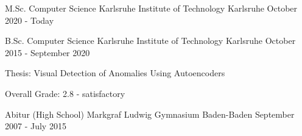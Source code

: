 


\begin{cventries}


\cventry
{M.Sc. Computer Science} %
{Karlsruhe Institute of Technology} %
{Karlsruhe} %
{October 2020 - Today} %
{ %
\begin{cvitems}
\end{cvitems}
}

\cventry
{B.Sc. Computer Science} %
{Karlsruhe Institute of Technology} %
{Karlsruhe} %
{October 2015 - September 2020} %
{ %
\begin{cvitems}
    \item{Thesis: Visual Detection of Anomalies Using Autoencoders}
    \item{Overall Grade: 2.8 - satisfactory}
\end{cvitems}
}

\cventry
{Abitur (High School)} %
{Markgraf Ludwig Gymnasium} %
{Baden-Baden} %
{September 2007 - July 2015} %
{ %
\begin{cvitems}
\end{cvitems}
}

\end{cventries}